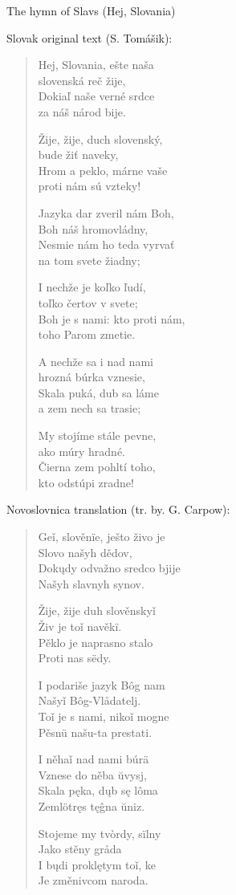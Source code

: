 The hymn of Slavs (Hej, Slovania)

Slovak original text (S. Tomášik):

\begin{verse}
	Hej, Slovania, ešte naša \\
	slovenská reč žije, \\
	Dokiaľ naše verné srdce \\
	za náš národ bije.
	
	Žije, žije, duch slovenský, \\
	bude žiť naveky, \\
	Hrom a peklo, márne vaše \\
	proti nám sú vzteky!
	
	Jazyka dar zveril nám Boh, \\
	Boh náš hromovládny, \\
	Nesmie nám ho teda vyrvať \\
	na tom svete žiadny;
	
	I nechže je koľko ľudí, \\
	toľko čertov v svete; \\
	Boh je s nami: kto proti nám, \\
	toho Parom zmetie.
	
	A nechže sa i nad nami \\
	hrozná búrka vznesie, \\
	Skala puká, dub sa láme \\
	a zem nech sa trasie;
	
	My stojíme stále pevne, \\
	ako múry hradné. \\
	Čierna zem pohltí toho, \\
	kto odstúpi zradne!
\end{verse}

Novoslovnica translation (tr. by. G. Carpow):

\begin{verse}
	Geǐ, slověnïe, ješto živo je \\
	Slovo našyh dědov, \\
	Dokųdy odvažno sredco bjije \\
	Našyh slavnyh synov.
	
	Žije, žije duh slověnskyǐ \\
	Živ je toǐ navěkï. \\
	Pěklo je naprasno stalo \\
	Proti nas sëdy.
	
	I podariše jazyk Bôg nam \\
	Našyǐ Bôg-Vlådatelj. \\
	Toǐ je s nami, nikoǐ mogne \\
	Pěsnü našu-ta prestati.
	
	I něhaǐ nad nami búrä \\
	Vznese do něba ŭvysj, \\
	Skala pęka, dųb sę lôma \\
	Zemlötręs tęĝna ŭniz.
	
	Stojeme my tvòrdy, sïlny \\
	Jako stěny gråda \\
	I bųdi proklętym toǐ, ke \\
	Je změnivcom naroda.
\end{verse}

